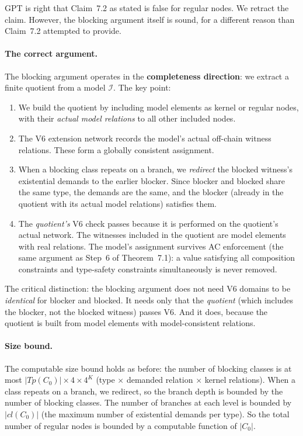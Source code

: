 \documentclass[11pt]{article}
\newcommand{\interp}{\mathcal{I}}
\newcommand{\cl}{\mathit{cl}}
\newcommand{\Tp}{\mathit{Tp}}
\theoremstyle{definition}
\begin{document}
GPT is right that Claim~7.2 as stated is false for regular
nodes.  We retract the claim.  However, the blocking argument
itself is sound, for a different reason than Claim~7.2
attempted to provide.

\paragraph{The correct argument.}
The blocking argument operates in the \textbf{completeness
direction}: we extract a finite quotient from a model $\interp$.
The key point:

\begin{enumerate}
\item We build the quotient by including model elements as
  kernel or regular nodes, with their \emph{actual model
  relations} to all other included nodes.
\item The V6 extension network records the model's actual
  off-chain witness relations.  These form a globally
  consistent assignment.
\item When a blocking class repeats on a branch, we
  \emph{redirect} the blocked witness's existential demands to
  the earlier blocker.  Since blocker and blocked share the
  same type, the demands are the same, and the blocker
  (already in the quotient with its actual model relations)
  satisfies them.
\item The \emph{quotient's} V6 check passes because it is
  performed on the quotient's actual network.  The witnesses
  included in the quotient are model elements with real
  relations.  The model's assignment survives AC enforcement
  (the same argument as Step~6 of Theorem~7.1): a value
  satisfying all composition constraints and type-safety
  constraints simultaneously is never removed.
\end{enumerate}

\noindent The critical distinction: the blocking argument does
not need V6 domains to be \emph{identical} for blocker and
blocked.  It needs only that the \emph{quotient} (which
includes the blocker, not the blocked witness) passes V6.  And
it does, because the quotient is built from model elements with
model-consistent relations.

\paragraph{Size bound.}
The computable size bound holds as before: the number of
blocking classes is at most
$|\Tp(C_0)| \times 4 \times 4^K$ (type $\times$ demanded
relation $\times$ kernel relations).  When a class repeats on
a branch, we redirect, so the branch depth is bounded by the
number of blocking classes.  The number of branches at each
level is bounded by $|\cl(C_0)|$ (the maximum number of
existential demands per type).  So the total number of regular
nodes is bounded by a computable function of $|C_0|$.
\end{document}
